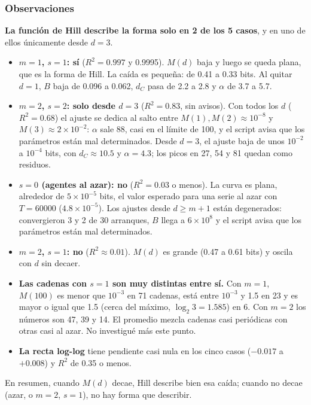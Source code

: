 \documentclass[11pt,letterpaper]{article}
\begin{document}
\subsubsection*{Observaciones}
\textbf{La función de Hill describe la forma solo en 2 de los 5 casos}, y en uno de ellos únicamente desde $d=3$.
\begin{itemize}
\item \textbf{$m=1$, $s=1$: sí} ($R^2=0.997$ y 0.9995). $M(d)$ baja y luego se queda plana, que es la forma de Hill. La caída es pequeña: de 0.41 a 0.33 bits. Al quitar $d=1$, $B$ baja de 0.096 a 0.062, $d_C$ pasa de 2.2 a 2.8 y $\alpha$ de 3.7 a 5.7.
\item \textbf{$m=2$, $s=2$: solo desde $d=3$} ($R^2=0.83$, sin avisos). Con todos los $d$ ($R^2=0.68$) el ajuste se dedica al salto entre $M(1),M(2)\approx10^{-8}$ y $M(3)\approx 2\times10^{-2}$: $\alpha$ sale 88, casi en el límite de 100, y el script avisa que los parámetros están mal determinados. Desde $d=3$, el ajuste baja de unos $10^{-2}$ a $10^{-4}$ bits, con $d_C\approx 10.5$ y $\alpha=4.3$; los picos en 27, 54 y 81 quedan como residuos.
\item \textbf{$s=0$ (agentes al azar): no} ($R^2=0.03$ o menos). La curva es plana, alrededor de $5\times10^{-5}$ bits, el valor esperado para una serie al azar con $T=60000$ ($4.8\times10^{-5}$). Los ajustes desde $d\ge m+1$ están degenerados: convergieron 3 y 2 de 30 arranques, $B$ llega a $6\times10^8$ y el script avisa que los parámetros están mal determinados.
\item \textbf{$m=2$, $s=1$: no} ($R^2\approx 0.01$). $M(d)$ es grande (0.47 a 0.61 bits) y oscila con $d$ sin decaer.
\item \textbf{Las cadenas con $s=1$ son muy distintas entre sí.} Con $m=1$, $M(100)$ es menor que $10^{-3}$ en 71 cadenas, está entre $10^{-3}$ y 1.5 en 23 y es mayor o igual que 1.5 (cerca del máximo, $\log_2 3=1.585$) en 6. Con $m=2$ los números son 47, 39 y 14. El promedio mezcla cadenas casi periódicas con otras casi al azar. No investigué más este punto.
\item \textbf{La recta log-log} tiene pendiente casi nula en los cinco casos ($-0.017$ a $+0.008$) y $R^2$ de 0.35 o menos.
\end{itemize}
En resumen, cuando $M(d)$ decae, Hill describe bien esa caída; cuando no decae (azar, o $m=2$, $s=1$), no hay forma que describir.
\end{document}

